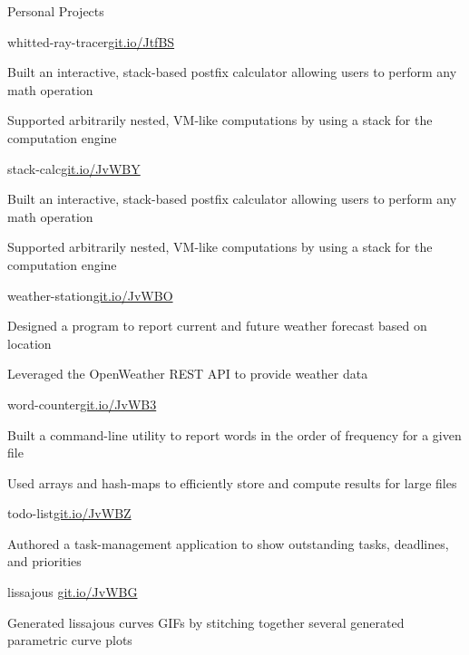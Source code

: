 \documentclass{resume} %
\begin{document}
\begin{rSection}{Personal Projects}
  \begin{rSubsection}{whitted-ray-tracer}{\href{https://git.io/JtfBS}{git.io/JtfBS}}{}{}
    \item Built an interactive, stack-based postfix calculator allowing users
      to perform any math operation
    \item Supported arbitrarily nested, VM-like computations by using a stack
      for the computation engine
  \end{rSubsection}

  \begin{rSubsection}{stack-calc}{\href{https://git.io/JvWBY}{git.io/JvWBY}}{}{}
    \item Built an interactive, stack-based postfix calculator allowing users
      to perform any math operation
    \item Supported arbitrarily nested, VM-like computations by using a stack
      for the computation engine
  \end{rSubsection}

  \begin{rSubsection}{weather-station}{\href{https://git.io/JvWBO}{git.io/JvWBO}}{}{}
    \item Designed a program to report current and future weather forecast
      based on location
    \item Leveraged the OpenWeather REST API to provide weather data
  \end{rSubsection}

  \begin{rSubsection} {word-counter}{\href{https://git.io/JvWB3}{git.io/JvWB3}}{}{}
    \item Built a command-line utility to report words in the order of
      frequency for a given file
    \item Used arrays and hash-maps to efficiently store and compute results
      for large files
  \end{rSubsection}

  \begin{rSubsection} {todo-list}{\href{https://git.io/JvWBZ}{git.io/JvWBZ}}{}{}
    \item Authored a task-management application to show outstanding tasks,
      deadlines, and priorities
  \end{rSubsection}

  \begin{rSubsection}{lissajous} {\href{https://git.io/JvWBG}{git.io/JvWBG}}{}{}
    \item Generated lissajous curves GIFs by stitching together several generated
      parametric curve plots
  \end{rSubsection}


\end{rSection}
\end{document}
